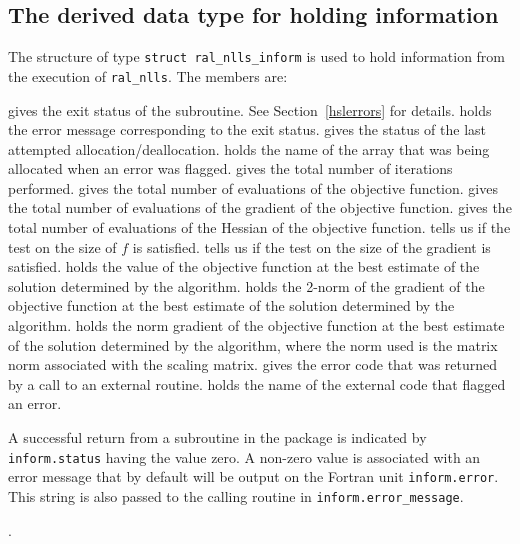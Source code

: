\documentclass{spec}
\begin{document}
\subsection{The derived data type for holding information}
\label{typeinform}
The structure of type {\tt struct ral\_nlls\_inform} is used
to hold information from the execution of {\tt ral\_nlls}.
The members are:
\begin{description}
 gives the exit status of the subroutine.  See Section~\ref{hslerrors} for details.
 holds the error message corresponding to the exit status.
 gives the status of the last attempted allocation/deallocation.
 holds the name of the array that was being allocated when an error was flagged.
 gives the total number of iterations performed.
 gives the total number of evaluations of the objective function.
 gives the total number of evaluations of the gradient of the objective function.
 gives the total number of evaluations of the Hessian of the objective function.
 tells us if the test on the size of \(f\) is satisfied.
 tells us if the test on the size of the gradient is satisfied.
 holds the value of the objective function at the best estimate of the solution determined by the algorithm.
 holds the 2-norm of the  gradient of the objective function at the best estimate of the solution determined by the algorithm.
 holds the norm gradient of the objective function at the best estimate of the solution determined by the algorithm, where the norm used is the matrix norm associated with the scaling matrix.
 gives the error code that was returned by a call to an external routine.
 holds the name of the external code that flagged an error.
\end{description}


\hslerrors

A successful return from a subroutine in the package is indicated by
{\tt inform.status} having the value zero.
A non-zero value is associated with an error message that by default will
be output on the Fortran unit {\tt inform.error}.  This string is also passed to the 
calling routine in {\tt inform.error\_message}.



\hslgeneral

.

\hslmethod
\label{method}

%

\hslexample




\end{document}
